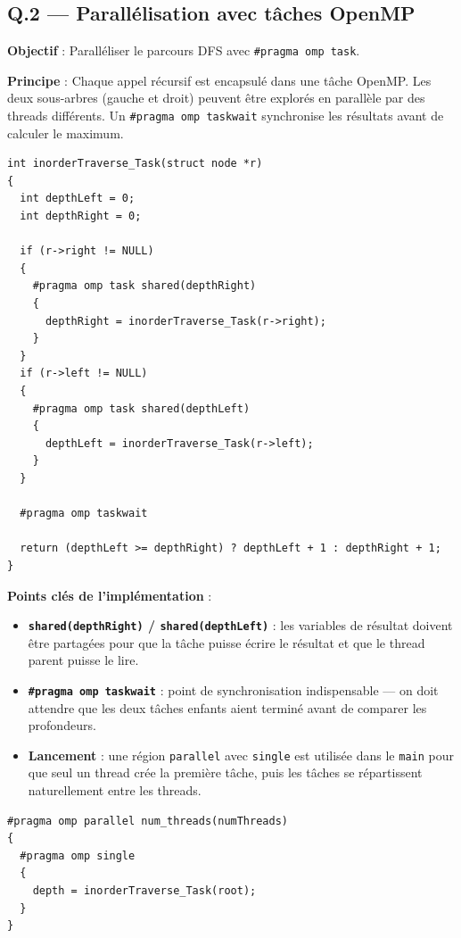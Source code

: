 \documentclass[12pt,a4paper]{article}
\begin{document}
\subsection{Q.2 --- Parallélisation avec tâches OpenMP}

\textbf{Objectif} : Paralléliser le parcours DFS avec \texttt{\#pragma omp task}.

\textbf{Principe} : Chaque appel récursif est encapsulé dans une tâche OpenMP.
Les deux sous-arbres (gauche et droit) peuvent être explorés en parallèle par
des threads différents. Un \texttt{\#pragma omp taskwait} synchronise les
résultats avant de calculer le maximum.

\begin{lstlisting}[caption={Version parallèle avec tâches --- Q.2}]
int inorderTraverse_Task(struct node *r)
{
  int depthLeft = 0;
  int depthRight = 0;

  if (r->right != NULL)
  {
    #pragma omp task shared(depthRight)
    {
      depthRight = inorderTraverse_Task(r->right);
    }
  }
  if (r->left != NULL)
  {
    #pragma omp task shared(depthLeft)
    {
      depthLeft = inorderTraverse_Task(r->left);
    }
  }

  #pragma omp taskwait

  return (depthLeft >= depthRight) ? depthLeft + 1 : depthRight + 1;
}
\end{lstlisting}

\textbf{Points clés de l'implémentation} :
\begin{itemize}
  \item \textbf{\texttt{shared(depthRight)} / \texttt{shared(depthLeft)}} : les
    variables de résultat doivent être partagées pour que la tâche puisse écrire
    le résultat et que le thread parent puisse le lire.
  \item \textbf{\texttt{\#pragma omp taskwait}} : point de synchronisation
    indispensable --- on doit attendre que les deux tâches enfants aient terminé
    avant de comparer les profondeurs.
  \item \textbf{Lancement} : une région \texttt{parallel} avec \texttt{single}
    est utilisée dans le \texttt{main} pour que seul un thread crée la première
    tâche, puis les tâches se répartissent naturellement entre les threads.
\end{itemize}

\begin{lstlisting}[caption={Lancement dans le main}]
#pragma omp parallel num_threads(numThreads)
{
  #pragma omp single
  {
    depth = inorderTraverse_Task(root);
  }
}
\end{lstlisting}
\end{document}
